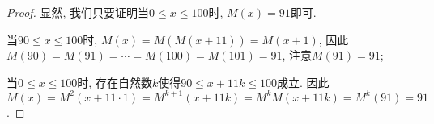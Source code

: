 \begin{proof}
    显然, 我们只要证明当$0\leqslant x\leqslant 100$时, $M(x)=91$即可.

    当$90\leqslant x \leqslant 100$时, $M(x)=M(M(x+11))=M(x+1)$, 因此$M(90)=M(91)=\cdots=M(100)=M(101)=91$, 注意$M(91)=91$;

    当$0\leqslant x \leqslant 100$时, 存在自然数$k$使得$90\leqslant x+11k\leqslant 100$成立. 因此$M(x)=M^2(x+11\cdot1)=M^{k+1}(x+11k)=M^kM(x+11k)=M^k(91)=91$.
\end{proof}